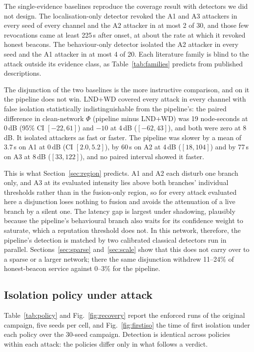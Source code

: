 The single-evidence baselines reproduce the coverage result with detectors
we did not design. The localisation-only detector revoked the A1 and A3
attackers in every seed of every channel and the A2 attacker in at most 2 of
30, and those few revocations came at least 225\,s after onset, at about the
rate at which it revoked honest beacons. The behaviour-only detector isolated
the A2 attacker in every seed and the A1 attacker in at most 4 of 20. Each
literature family is blind to the attack outside its evidence class, as
Table~\ref{tab:families} predicts from published descriptions.

The disjunction of the two baselines is the more instructive comparison, and
on it the pipeline does not win. LND+WD covered every attack in every channel
with false isolation statistically indistinguishable from the pipeline's: the
paired difference in clean-network $\Phi$ (pipeline minus LND+WD) was 19
node-seconds at 0\,dB (95\% CI $[-22, 61]$) and $-10$ at 4\,dB ($[-62, 43]$),
and both were zero at 8\,dB. It isolated attackers as fast or faster. The
pipeline was slower by a mean of 3.7\,s on A1 at 0\,dB (CI $[2.0, 5.2]$), by
60\,s on A2 at 4\,dB ($[18, 104]$) and by 77\,s on A3 at 8\,dB ($[33, 122]$),
and no paired interval showed it faster.

This is what Section~\ref{sec:region} predicts. A1 and A2 each disturb one
branch only, and A3 at its evaluated intensity lies above both branches'
individual thresholds rather than in the fusion-only region, so for every
attack evaluated here a disjunction loses nothing to fusion and
avoids the attenuation of a live branch by a silent one. The latency gap is
largest under shadowing, plausibly because the pipeline's behavioural branch
also waits for its confidence weight to saturate, which a reputation
threshold does not. In this network, therefore, the pipeline's detection is
matched by two calibrated classical detectors run in parallel.
Sections~\ref{sec:sparse} and~\ref{sec:scale} show that this does not carry
over to a sparse or a larger network; there the same disjunction withdrew
11--24\% of honest-beacon service against 0--3\% for the pipeline.

\subsection{Isolation policy under attack}
\label{sec:policy}

Table~\ref{tab:policy} and Fig.~\ref{fig:recovery} report the enforced runs of
the original campaign, five seeds per cell, and Fig.~\ref{fig:firstiso} the time
of first isolation under each policy over the 30-seed campaign. Detection is
identical across policies within each attack: the policies differ only in what
follows a verdict.

